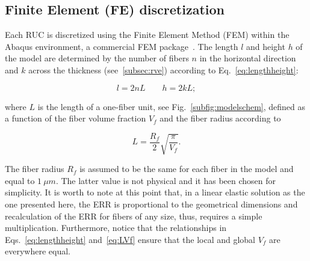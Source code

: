 \documentclass[review]{elsarticle}
\begin{document}
%

\subsection{Finite Element (FE) discretization}

Each RUC is discretized using the Finite Element Method (FEM) within the Abaqus environment, a commercial FEM package~\cite{abq12}. The length $l$ and height $h$ of the model are determined by the number of fibers $n$ in the horizontal direction and $k$ across the thickness (see~\ref{subsec:rve}) according to Eq.~\ref{eq:lengthheight}:

\begin{equation}\label{eq:lengthheight}
l=2nL\qquad h=2kL;
\end{equation}

where $L$ is the length of a one-fiber unit, see Fig.~\ref{subfig:modelschem}, defined as a function of the fiber volume fraction $V_{f}$ and the fiber radius according to

\begin{equation}\label{eq:LVf}
L=\frac{R_{f}}{2}\sqrt{\frac{\pi}{V_{f}}}.
\end{equation}

The fiber radius $R_{f}$ is assumed to be the same for each fiber in the model and equal to $1\ \mu m$. The latter value is not physical and it has been chosen for simplicity. It is worth to note at this point that, in a linear elastic solution as the one presented here, the ERR is proportional to the geometrical dimensions and recalculation of the ERR for fibers of any size, thus, requires a simple multiplication. Furthermore, notice that the relationships in Eqs.~\ref{eq:lengthheight} and~\ref{eq:LVf} ensure that the local and global $V_{f}$ are everywhere equal.
\end{document}

